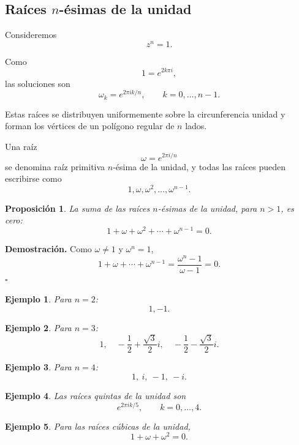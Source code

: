 \documentclass[12pt]{article}
\newtheorem{Ejem}{Ejemplo}
\newtheorem{Prop}{Proposici\'on}
\begin{document}
\subsection*{Raíces $n$-ésimas de la unidad}

Consideremos
\[
z^n=1.
\]

Como
\[
1=e^{2k\pi i},
\]
las soluciones son
\[
\boxed{
\omega_k=e^{2\pi i k/n},
\qquad
k=0,\ldots,n-1.
}
\]

Estas raíces se distribuyen uniformemente sobre la circunferencia unidad y
forman los vértices de un polígono regular de $n$ lados.

Una raíz
\[
\omega=e^{2\pi i/n}
\]
se denomina raíz primitiva $n$-ésima de la unidad, y todas las raíces pueden
escribirse como
\[
1,\omega,\omega^2,\ldots,\omega^{n-1}.
\]


\begin{Prop}
La suma de las raíces $n$-ésimas de la unidad, para $n>1$, es cero:
\[
\boxed{
1+\omega+\omega^2+\cdots+\omega^{n-1}=0.
}
\]
\end{Prop}



\textbf{Demostración.}
Como $\omega\neq1$ y $\omega^n=1$,
\[
1+\omega+\cdots+\omega^{n-1}
=
\frac{\omega^n-1}{\omega-1}
=
0.
\]
\hfill$\square$



\begin{Ejem}
Para $n=2$:
\[
1,-1.
\]

\end{Ejem}


\begin{Ejem}
Para $n=3$:
\[
1,\quad
-\frac12+\frac{\sqrt3}{2}i,\quad
-\frac12-\frac{\sqrt3}{2}i.
\]

\end{Ejem}


\begin{Ejem}
Para $n=4$:
\[
1,\ i,\ -1,\ -i.
\]

\end{Ejem}


\begin{Ejem}
Las raíces quintas de la unidad son
\[
e^{2\pi ik/5},
\qquad
k=0,\ldots,4.
\]

\end{Ejem}


\begin{Ejem}
Para las raíces cúbicas de la unidad,
\[
1+\omega+\omega^2=0.
\]
\end{Ejem}
\end{document}
